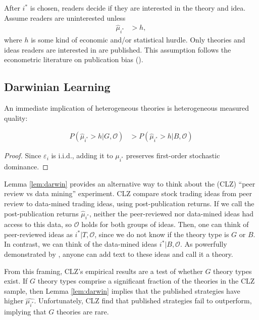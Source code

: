 \documentclass[12pt,english]{article}
\theoremstyle{plain}
\theoremstyle{plain}
\begin{document}
After $i^{\ast}$ is chosen, readers decide if they are interested in the theory and idea. Assume readers are uninterested unless 
\begin{align}\label{eq:hurdle}
\hat{\mu}_{i^{\ast}} & >h,
\end{align}
where $h$ is some kind of economic and/or statistical hurdle. Only theories and ideas readers are interested in are published. This assumption follows the econometric literature on publication bias (\citet{andrews2019identification}).




 

\subsection{Darwinian Learning}

An immediate implication of heterogeneous theories is heterogeneous measured quality:
\begin{lemma}
    \label{lem:darwin}
    \begin{align}
        P\left(\hat{\mu}_{i^{\ast}}>h|G,\mathcal{O}\right) 
        &>
        P\left(\hat{\mu}_{i^{\ast}}>h|B,\mathcal{O}\right)
    \end{align}
\end{lemma}
\begin{proof}
    Since $\varepsilon_{i}$ is i.i.d., adding it to $\mu_{i^{\ast}}$ preserves first-order stochastic dominance.
\end{proof}

Lemma \ref{lem:darwin} provides an alternative way to think about the \citet{chen2022peer} (CLZ) ``peer review vs data mining'' experiment. CLZ compare stock trading ideas from peer review to data-mined trading ideas, using post-publication returns. If we call the post-publication returns $\hat{\mu}_{i^\ast}$, neither the peer-reviewed nor data-mined ideas had access to this data, so $\mathcal{O}$ holds for both groups of ideas. Then, one can think of peer-reviewed ideas as $i^\ast|T,\mathcal{O}$, since we do not know if the theory type is $G$ or $B$. In contrast, we can think of the data-mined ideas $i^\ast |B,\mathcal{O}$. As powerfully demonstrated by \citet{novy2025ai}, anyone can add text to these ideas and call it a theory. 

From this framing, CLZ's empirical results are a test of whether $G$ theory types exist. If $G$ theory types comprise a significant fraction of the theories in the CLZ sample, then Lemma \ref{lem:darwin} implies that the published strategies have higher $\hat{\mu_{i^\ast}}$. Unfortunately, CLZ find that published strategies fail to outperform, implying that $G$ theories are rare. 
\end{document}
